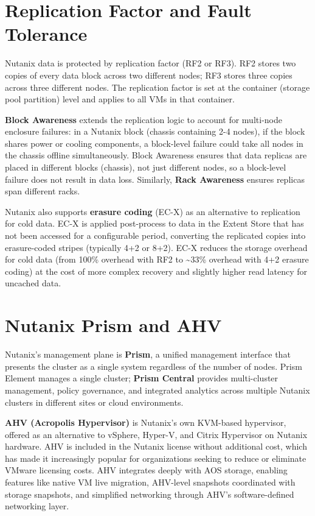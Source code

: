 \section{Replication Factor and Fault Tolerance}
Nutanix data is protected by replication factor (RF2 or RF3). RF2 stores two copies of every data block across two different nodes; RF3 stores three copies across three different nodes. The replication factor is set at the container (storage pool partition) level and applies to all VMs in that container.

\textbf{Block Awareness} extends the replication logic to account for multi-node enclosure failures: in a Nutanix block (chassis containing 2-4 nodes), if the block shares power or cooling components, a block-level failure could take all nodes in the chassis offline simultaneously. Block Awareness ensures that data replicas are placed in different blocks (chassis), not just different nodes, so a block-level failure does not result in data loss. Similarly, \textbf{Rack Awareness} ensures replicas span different racks.

Nutanix also supports \textbf{erasure coding} (EC-X) as an alternative to replication for cold data. EC-X is applied post-process to data in the Extent Store that has not been accessed for a configurable period, converting the replicated copies into erasure-coded stripes (typically 4+2 or 8+2). EC-X reduces the storage overhead for cold data (from 100\% overhead with RF2 to \~{}33\% overhead with 4+2 erasure coding) at the cost of more complex recovery and slightly higher read latency for uncached data.

\section{Nutanix Prism and AHV}
Nutanix's management plane is \textbf{Prism}, a unified management interface that presents the cluster as a single system regardless of the number of nodes. Prism Element manages a single cluster; \textbf{Prism Central} provides multi-cluster management, policy governance, and integrated analytics across multiple Nutanix clusters in different sites or cloud environments.

\textbf{AHV (Acropolis Hypervisor)} is Nutanix's own KVM-based hypervisor, offered as an alternative to vSphere, Hyper-V, and Citrix Hypervisor on Nutanix hardware. AHV is included in the Nutanix license without additional cost, which has made it increasingly popular for organizations seeking to reduce or eliminate VMware licensing costs. AHV integrates deeply with AOS storage, enabling features like native VM live migration, AHV-level snapshots coordinated with storage snapshots, and simplified networking through AHV's software-defined networking layer.

